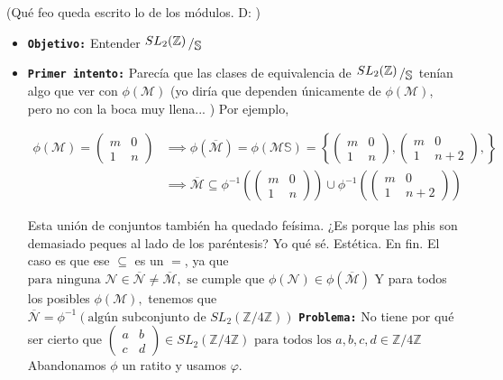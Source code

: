 \documentclass{article}
\newcommand\tab[1][0.6cm]{\hspace*{#1}}
\newcommand\nl{\newline\tab}
\newcommand{\bigslant}[2]{{\raisebox{.2em}{$#1$}\left/\raisebox{-.2em}{$#2$}\right.}}
\begin{document}
	(Qué feo queda escrito lo de los módulos. D: )
	\begin{itemize}
		\item \textbf{\texttt {Objetivo:}} Entender 
		$ \bigslant{SL_2(\mathbb{Z})}{\mathbb{S}}$ \nl
		\item \textbf{\texttt {Primer intento:}} Parecía que las clases de equivalencia de $ \bigslant{SL_2(\mathbb{Z})}{\mathbb{S}}$ tenían algo que ver con $\phi(\mathcal{M})$ (yo diría que dependen únicamente de $\phi(\mathcal{M})$, pero no con la boca muy llena... ) Por ejemplo, %
		
		\begin{align*}
		\phi(\mathcal{M}) = 
		\begin{pmatrix}
		m & 0 \\
		1 & n 
		\end{pmatrix} & \implies
		\phi(\overline{\mathcal{M}}) = 
		\phi(\mathcal{M}\mathbb{S}) = \left\{
		\begin{pmatrix}
		m & 0 \\
		1 & n 
		\end{pmatrix},
		\begin{pmatrix}
		m & 0 \\
		1 & n+2 
		\end{pmatrix},
		\right\}	\\			
		& \implies \overline{\mathcal{M}} \subseteq 
		 \phi^{-1}\left( 
		 \begin{pmatrix}
		 m & 0 \\
		 1 & n 
		 \end{pmatrix}
		  \right) 
		 \cup
		 \phi^{-1}\left( 
		 \begin{pmatrix}
		 m & 0 \\
		 1 & n+2 
		 \end{pmatrix}
		 \right)%
		 \end{align*}
		 
		 \tab Esta unión de conjuntos también ha quedado feísima.\nl 
		 ¿Es porque las phis son demasiado peques al lado de los paréntesis? Yo qué sé. Estética. En fin.\nl 
		  El caso es que ese $\subseteq $ es un $=$, ya que 
		 $\text{para ninguna } \mathcal{N} \in \overline{\mathcal{N}} \neq \overline{\mathcal{M}} , \text{ se cumple que }\phi(\mathcal{N}) \in \phi(\overline{\mathcal{M}})$ \nl
		 Y para todos los posibles $\phi(\mathcal{M}),$ tenemos que $ \overline{\mathcal{N}}  = \phi^{-1}\left( \text{algún subconjunto de } SL_2(\mathbb{Z}/ 4\mathbb{Z}) \right)$ \nl\nl
		 \textbf{\texttt {Problema:}} No tiene por qué ser cierto que $
		 \begin{pmatrix}
		 a & b \\
		 c & d 
		 \end{pmatrix} \in SL_2(\mathbb{Z}/ 4\mathbb{Z}) \text{ para todos los } a,b,c,d \in \mathbb{Z}/ 4\mathbb{Z}
		 $ Abandonamos $\phi$ un ratito y usamos $\varphi$.
		 

\end{itemize}
\end{document}
